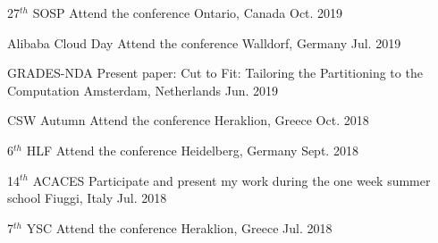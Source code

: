 \begin{cvhonors}
  \cvhonor
    {27$^{th}$ SOSP} %
    {Attend the conference} %
    {Ontario, Canada} %
    {Oct. 2019} %

  \cvhonor
    {Alibaba Cloud Day} %
    {Attend the conference} %
    {Walldorf, Germany} %
    {Jul. 2019} %

  \cvhonor
    {GRADES-NDA} %
    {Present paper: Cut to Fit: Tailoring the Partitioning to the
    Computation} %
    {Amsterdam, Netherlands} %
    {Jun. 2019} %

  \cvhonor
    {CSW Autumn} %
    {Attend the conference} %
    {Heraklion, Greece} %
    {Oct. 2018} %

  \cvhonor
    {6$^{th}$ HLF} %
    {Attend the conference} %
    {Heidelberg, Germany} %
    {Sept. 2018} %

  \cvhonor
    {14$^{th}$ ACACES} %
    {Participate and present my work during the one week summer school} %
    {Fiuggi, Italy} %
    {Jul. 2018} %

  \cvhonor
    {7$^{th}$ YSC} %
    {Attend the conference} %
    {Heraklion, Greece} %
    {Jul. 2018} %


\end{cvhonors}

